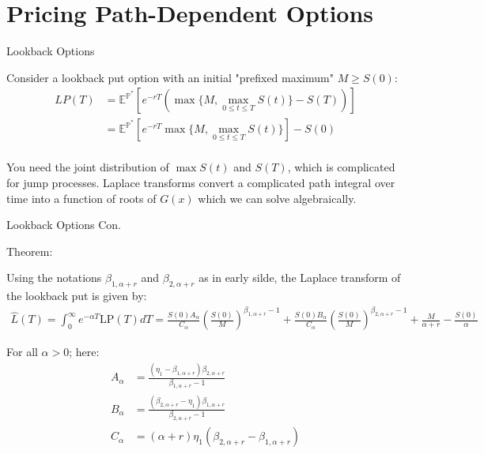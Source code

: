 \documentclass{beamer}
\begin{document}
\section{Pricing Path-Dependent Options}
\begin{frame}{Lookback Options}

    {\footnotesize \footnotesize
    \par Consider a lookback put option with an initial "prefixed maximum" \( M \geq S(0) \):
    \vspace{1em}
    \begin{align*}
        LP(T) &= \mathbb{E}^{\mathbb{P}^*} \left[ e^{-rT} \left( \max\{M, \max_{0 \leq t \leq T} S(t)\} - S(T) \right) \right]\\
        & =   \mathbb{E}^{\mathbb{P}^*}\left[ e^{-rT} \max\{M, \max_{0 \leq t \leq T} S(t)\} \right] - S(0)\\
    \end{align*}

    \par  \pause You need the joint distribution of $\max S(t)$ and $S(T)$, which is complicated for jump processes. 
    Laplace transforms convert a complicated path integral over time into a function of roots of $G(x)$
    which we can solve algebraically.
    }
    
\end{frame}

\begin{frame}{Lookback Options Con.}

    \par Theorem:
    {\footnotesize \footnotesize
    
    \vspace{1em}
    \par Using the notations \(\beta_{1,\alpha+r}\) 
    and \(\beta_{2,\alpha+r}\) as in early silde, the Laplace transform of the lookback put is given by:
    \vspace{1em}
    {\footnotesize \tiny
    \begin{align*}
        \hat{L}(T) = \int_0^\infty e^{-\alpha T} \mathrm{LP}(T)  dT = \frac{S(0)A_\alpha}{C_\alpha} \left( \frac{S(0)}{M} \right)^{\beta_{1,\alpha+r}-1} 
        + \frac{S(0)B_\alpha}{C_\alpha} \left( \frac{S(0)}{M} \right)^{\beta_{2,\alpha+r}-1}  
        + \frac{M}{\alpha+r} - \frac{S(0)}{\alpha}
    \end{align*}
    }
    \vspace{1em}
    \par  \pause For all \(\alpha > 0\); here:
    \vspace{1em}
    \begin{align*}
        A_\alpha &= \frac{(\eta_1 - \beta_{1,\alpha+r}) \beta_{2,\alpha+r}}{\beta_{1,\alpha+r} - 1} \\
        B_\alpha &= \frac{(\beta_{2,\alpha+r} - \eta_1) \beta_{1,\alpha+r}}{\beta_{2,\alpha+r} - 1}\\
        C_\alpha &= (\alpha + r) \eta_1 (\beta_{2,\alpha+r} - \beta_{1,\alpha+r})
    \end{align*}

    }
    
\end{frame}
\end{document}
